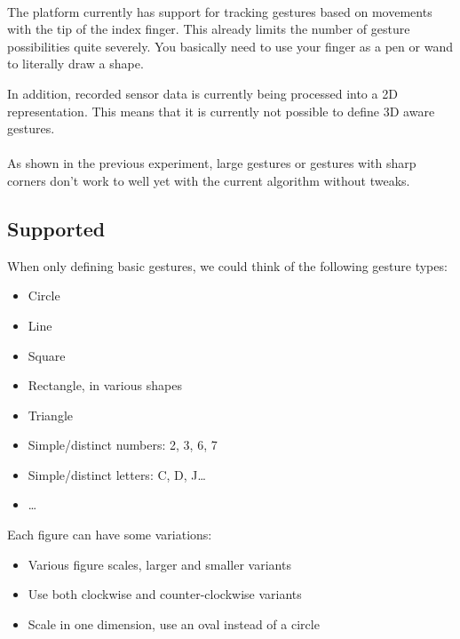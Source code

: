 \documentclass[a4paper]{article}
\providecommand{\tightlist}{%
\setlength{\itemsep}{0pt}\setlength{\parskip}{0pt}}
\begin{document}
  \paragraph{}
  The platform currently has support for tracking gestures based on movements
  with the tip of the index finger. This already limits the number of gesture
  possibilities quite severely. You basically need to use your finger as a pen
  or wand to literally draw a shape.

  In addition, recorded sensor data is currently being processed into a 2D
  representation. This means that it is currently not possible to define 3D
  aware gestures.

  \paragraph{}
  As shown in the previous experiment, large gestures or gestures with sharp
  corners don't work to well yet with the current algorithm without tweaks.

  \subsection{Supported}
  When only defining basic gestures, we could think of the following gesture
  types:

  \begin{itemize}
    \tightlist
    \item Circle
    \item Line
    \item Square
    \item Rectangle, in various shapes
    \item Triangle
    \item Simple/distinct numbers: 2, 3, 6, 7
    \item Simple/distinct letters: C, D, J\dots
    \item \dots
  \end{itemize}

  Each figure can have some variations:
  \begin{itemize}
    \tightlist
    \item Various figure scales, larger and smaller variants
    \item Use both clockwise and counter-clockwise variants
    \item Scale in one dimension, use an oval instead of a circle
  \end{itemize}
\end{document}
